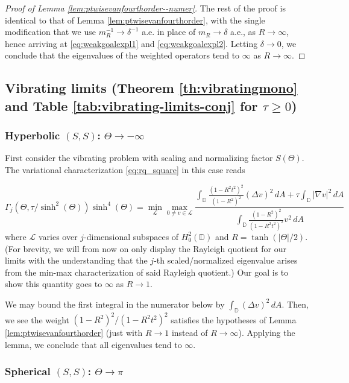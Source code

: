 \documentclass[11pt]{amsart}
\theoremstyle{definition}
\numberwithin{equation}{section}
\newcommand{\lapl}{\Delta}
\newcommand{\grad}{\nabla}
\newcommand{\D}{\mathbb{D}}
\begin{document}
\begin{proof}[Proof of Lemma \ref{lem:ptwisevanfourthorder--numer}]
The rest of the proof is identical to that of Lemma \ref{lem:ptwisevanfourthorder}, with the single modification that we use $m_R^{-1}\to \delta^{-1}$ a.e. in place of $m_R \to \delta$ a.e., as $R \to \infty$, hence arriving at \eqref{eq:weakgoalexpl1} and \eqref{eq:weakgoalexpl2}. Letting $\delta \to 0$, we conclude that the eigenvalues of the weighted operators tend to $\infty$ as $R \to \infty$.
\end{proof}

\subsection*{Vibrating limits (Theorem \ref{th:vibratingmono} and Table \ref{tab:vibrating-limits-conj} for $\tau \geq 0$)}


\subsubsection*{Hyperbolic $(S,S)$: $\Theta \to -\infty$}

First consider the vibrating problem with scaling and normalizing factor $S(\Theta)$. The variational characterization \eqref{eq:rq_square} in this case reads 

\[
\Gamma_j(\Theta, \tau/\sinh^2(\Theta))\sinh^4(\Theta) =\min_{\mathcal{L}}\max_{0 \neq v \in \mathcal{L}}\dfrac{\displaystyle \int_{\D}\frac{(1-R^2t^2)^2}{(1-R^2)^2}(\lapl v)^2 \,  dA +  \tau\int_{\D}|\grad v|^2 \, dA}{\displaystyle \int_{\D} \frac{(1-R^2)^2}{(1-R^2t^2)^2}v^2 \, dA}
\]
where $\mathcal{L}$ varies over $j$-dimensional subspaces of $H_0^2(\D)$ and $R = \tanh(|\Theta|/2).$ (For brevity, we will from now on only display the Rayleigh quotient for our limits with the understanding that the $j$-th scaled/normalized eigenvalue arises from the min-max characterization of said Rayleigh quotient.) Our goal is to show this quantity goes to $\infty$ as $R \to 1$.

We may bound the first integral in the numerator below by $\int_\D (\lapl v)^2\, dA$. Then, we see the weight $(1-R^2)^2/(1-R^2t^2)^2$ satisfies the hypotheses of Lemma \ref{lem:ptwisevanfourthorder} (just with $R \to 1$ instead of $R \to \infty$). Applying the lemma, we conclude that all eigenvalues tend to $\infty$.

\subsubsection*{Spherical $(S,S)$: $\Theta\to\pi$}
\end{document}
